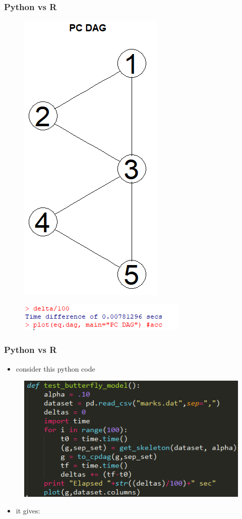 \documentclass[xcolor ={table,usenames,dvipsnames}]{beamer}
\theoremstyle{definition}
\begin{document}
\begin{frame}
\frametitle{Python vs R}
\begin{figure}[h!]
	\centering
	\includegraphics[scale=0.35]{img/rdag.PNG}
\end{figure}
\begin{figure}[h!]
	\centering
	\includegraphics[scale=0.5]{img/rtime}
\end{figure}
\end{frame}
\begin{frame}
\frametitle{Python vs R}
\begin{itemize}
	\item consider this python code
	\end{itemize}
\begin{figure}[h!]
	\centering
	\includegraphics[scale=0.7]{img/py.PNG}
\end{figure}
\begin{itemize}
	\item it gives:
\end{itemize}
\end{frame}
\end{document}
